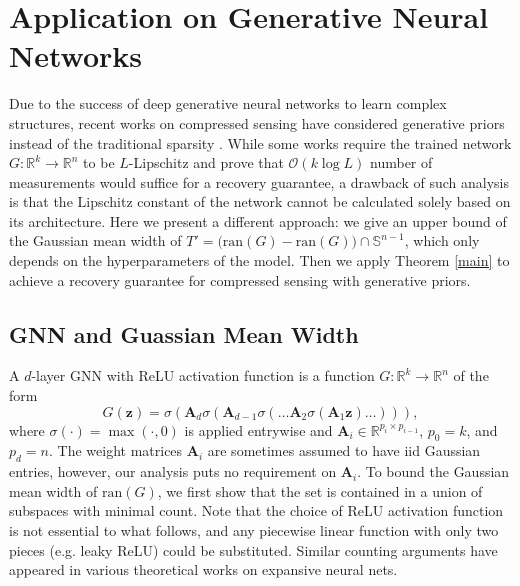 \documentclass{article}
\begin{document}
\section{Application on Generative Neural Networks} \label{app}
\par

Due to the success of deep generative neural networks to learn complex structures, recent works on compressed sensing have considered generative priors instead of the traditional sparsity \cite{bora2017compressed}. While some works require the trained network $G: \mathbb{R}^k \rightarrow \mathbb{R}^n$ to be $L$-Lipschitz \cite{bora2017compressed} and prove that $\mathcal{O}(k \log L)$ number of measurements would suffice for a recovery guarantee, a drawback of such analysis is that the Lipschitz constant of the network cannot be calculated solely based on its architecture. Here we present a different approach: we give an upper bound of the Gaussian mean width of $T' = \big(\mathrm{ran}(G) - \mathrm{ran}(G)\big) \cap \mathbb{S}^{n-1}$, which only depends on the hyperparameters of the model. Then we apply Theorem \ref{main} to achieve a recovery guarantee for compressed sensing with generative priors.

\subsection{GNN and Guassian Mean Width} \label{GMW}
\par
    A $d$-layer GNN with ReLU activation function is a function $G: \mathbb{R}^k \rightarrow \mathbb{R}^n$ of the form
    \begin{equation} \label{gnn}
        G(\mathbf{z}) = \sigma(\mathbf{A}_d \sigma(\mathbf{A}_{d-1} \sigma( \dots \mathbf{A}_2 \sigma (\mathbf{A}_1 \mathbf{z}) \dots ))),
    \end{equation}
where $\sigma(\cdot) = \max(\cdot, 0)$ is applied entrywise and $\mathbf{A}_i \in \mathbb{R}^{p_i \times p_{i-1}}$, $p_0 = k$, and $p_d = n$. The weight matrices $\mathbf{A}_i$ are sometimes assumed to have iid Gaussian entries, however, our analysis puts no requirement on $\mathbf{A}_i$. To bound the Gaussian mean width of $\mathrm{ran}(G)$, we first show that the set is contained in a union of subspaces with minimal count. 
Note that the choice of ReLU activation function is not essential to what follows, and any piecewise linear function with only two pieces (e.g. leaky ReLU) could be substituted.  Similar counting arguments have appeared in various theoretical works on expansive neural nets.
\end{document}
